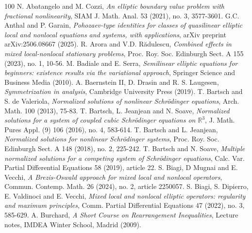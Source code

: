 \documentclass[11pt]{article}
\numberwithin{equation}{section}
\numberwithin{mytheorem}{section}
\begin{document}
				\begin{thebibliography}{100}
					 N. Abatangelo and M. Cozzi, {\it An elliptic boundary value problem with fractional nonlinearity}, SIAM J. Math. Anal. 53 (2021), no. 3, 3577-3601.
					 G.C. Anthal and P. Garain, {\it Pohozaev-type identities for classes of quasilinear elliptic local and nonlocal equations and systems, with applications}, arXiv preprint arXiv:2506.08667 (2025). 
					 R. Arora and V.D. R\u adulescu, {\it Combined effects in mixed local-nonlocal stationary problems}, Proc. Roy. Soc. Edinburgh Sect. A 155 (2023), no. 1, 10-56. 
					 M. Badiale and E. Serra, {\it Semilinear elliptic equations for beginners: existence results via the variational approach}, Springer Science and Business Media (2010).
					A. Baernstein II, D. Drasin and R. S. Laugesen, {\it Symmetrization in analysis}, Cambridge University Press (2019).
					T. Bartsch and S. de Valeriola, {\it Normalized solutions of nonlinear Schrödinger equations}, Arch. Math. 100 (2013), 75-83.
					T. Bartsch, L. Jeanjean and N. Soave, {\it  Normalized solutions for a system of coupled cubic Schrödinger equations on $\mathbb{R}^3$}, J. Math. Pures Appl. (9) 106 (2016), no. 4, 583-614.
					T. Bartsch and L. Jeanjean, {\it Normalized solutions for nonlinear Schrödinger systems}, Proc. Roy. Soc. Edinburgh Sect. A 148 (2018), no. 2, 225-242.
					T. Bartsch and N. Soave, {\it Multiple normalized solutions for a competing system of Schrödinger equations}, Calc. Var. Partial Differential Equations 58 (2019), article 22.
					S. Biagi, D Mugnai and E. Vecchi, {\it A Brezis-Oswald approach for mixed local and nonlocal operators}, Commun. Contemp. Math. 26 (2024), no. 2, article 2250057.
					S. Biagi, S. Dipierro, E. Valdinoci and E. Vecchi, {\it Mixed local and nonlocal elliptic operators: regularity and maximum principles}, Comm. Partial Differential Equations 47 (2022), no. 3, 585-629.
					 A. Burchard, {\it A Short Course on Rearrangement Inequalities}, Lecture notes, IMDEA Winter School, Madrid (2009).

\end{thebibliography}
\end{document}
